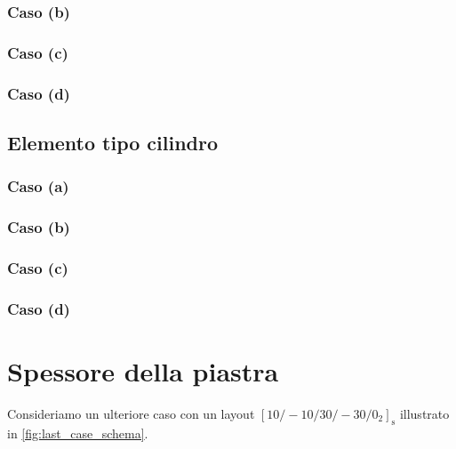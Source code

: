\documentclass[a4paper,num-refs]{oup-contemporary}
\begin{document}
\textcolor{blue}{\lipsum[1-2]}


\subsubsection{Caso (b)}
\textcolor{blue}{\lipsum[1-2]}
\subsubsection{Caso (c)}
\textcolor{blue}{\lipsum[1-2]}
\subsubsection{Caso (d)}
\textcolor{blue}{\lipsum[1-2]}

\subsection{Elemento tipo cilindro}

\subsubsection{Caso (a)}
\textcolor{blue}{\lipsum[1-2]}
\subsubsection{Caso (b)}
\label{sec:cyl_B}
\textcolor{blue}{\lipsum[1-2]}
\subsubsection{Caso (c)}
\label{sec:cyl_C}
\textcolor{blue}{\lipsum[1-2]}
\subsubsection{Caso (d)}
\textcolor{blue}{\lipsum[1-2]}


\section{Spessore della piastra}

Consideriamo un ulteriore caso con un layout $[10 /-10 / 30 /-30 / 0_2]_{\mathrm{s}}$ illustrato in \cref{fig:last_case_schema}. 
\end{document}
